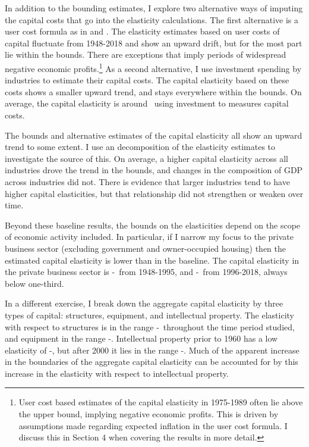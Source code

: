 \documentclass[11pt]{article}
\begin{document}
In addition to the bounding estimates, I explore two alternative ways of imputing the capital costs that go into the elasticity calculations. The first alternative is a user cost formula \citep{halljorg1967} as in \cite{Barkai000} and \cite{rognlie2015}. The elasticity estimates based on user costs of capital fluctuate from 1948-2018 and show an upward drift, but for the most part lie within the bounds. There are exceptions that imply periods of widespread negative economic profits.\footnote{User cost based estimates of the capital elasticity in 1975-1989 often lie above the upper bound, implying negative economic profits. This is driven by assumptions made regarding expected inflation in the user cost formula. I discuss this in Section 4 when covering the results in more detail.} As a second alternative, I use investment spending by industries to estimate their capital costs. The capital elasticity based on these costs shows a smaller upward trend, and stays everywhere within the bounds. On average, the capital elasticity is around \baseinv \ using investment to measures capital costs.

The bounds and alternative estimates of the capital elasticity all show an upward trend to some extent. I use an \cite{op1996} decomposition of the elasticity estimates to investigate the source of this. On average, a higher capital elasticity across all industries drove the trend in the bounds, and changes in the composition of GDP across industries did not. There is evidence that larger industries tend to have higher capital elasticities, but that relationship did not strengthen or weaken over time.

Beyond these baseline results, the bounds on the elasticities depend on the scope of economic activity included. In particular, if I narrow my focus to the private business sector (excluding government and owner-occupied housing) then the estimated capital elasticity is lower than in the baseline. The capital elasticity in the private business sector is \nohsearlydepr-\nohsearlynoprofit \ from 1948-1995, and \nohslatedepr-\nohslatenoprofit \ from 1996-2018, always below one-third. 

In a different exercise, I break down the aggregate capital elasticity by three types of capital: structures, equipment, and intellectual property. The elasticity with respect to structures is in the range \basestdepr-\basetnoprofit \ throughout the time period studied, and equipment in the range \baseeqdepr-\baseeqnoprofit. Intellectual property prior to 1960 has a low elasticity of \baseipearlydepr-\baseipearlynoprofit, but after 2000 it lies in the range \baseiplatedepr-\baseiplatenoprofit. Much of the apparent increase in the boundaries of the aggregate capital elasticity can be accounted for by this increase in the elasticity with respect to intellectual property.
\end{document}
